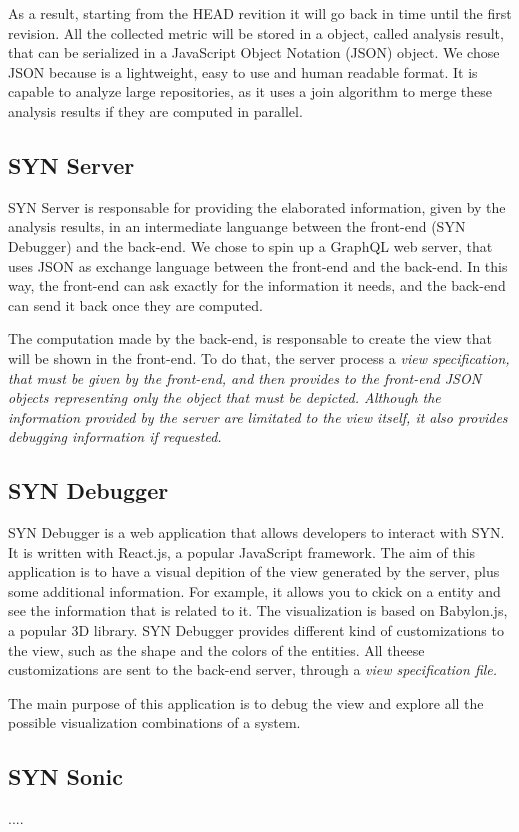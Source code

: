 As a result, starting from the HEAD revition it will go back in time until the first revision.
All the collected metric will be stored in a object, called analysis result, that can be serialized in a JavaScript Object Notation (JSON) object. 
We chose JSON because is a lightweight, easy to use and human readable format.
It is capable to analyze large repositories, as it uses a join algorithm to merge these analysis results if they are computed in parallel.

\subsection{SYN Server}
SYN Server is responsable for providing the elaborated information, given by the analysis results, in an intermediate languange between the 
front-end (SYN Debugger) and the back-end. We chose to spin up a GraphQL web server, that uses JSON as exchange language between the front-end and the back-end.
In this way, the front-end can ask exactly for the information it needs, and the back-end can send it back once they are computed. 

The computation made by the back-end, is responsable to create the view that will be shown in the front-end.
To do that, the server process a \it{view specification}, that must be given by the front-end, 
and then provides to the front-end JSON objects representing only the object that must be depicted. 
Although the information provided by the server are limitated to the view itself, it also provides debugging information if requested. 

\subsection{SYN Debugger}

SYN Debugger is a web application that allows developers to interact with SYN. It is written with React.js, a popular JavaScript framework. 
The aim of this application is to have a visual depition of the view generated by the server, plus some additional information. 
For example, it allows you to ckick on a entity and see the information that is related to it. 
The visualization is based on Babylon.js, a popular 3D library. 
SYN Debugger provides different kind of customizations to the view, such as the shape and the colors of the entities. 
All theese customizations are sent to the back-end server, through a \it{view specification} file. 

The main purpose of this application is to debug the view and explore all the possible visualization combinations of a system. 

\subsection{SYN Sonic}

....
